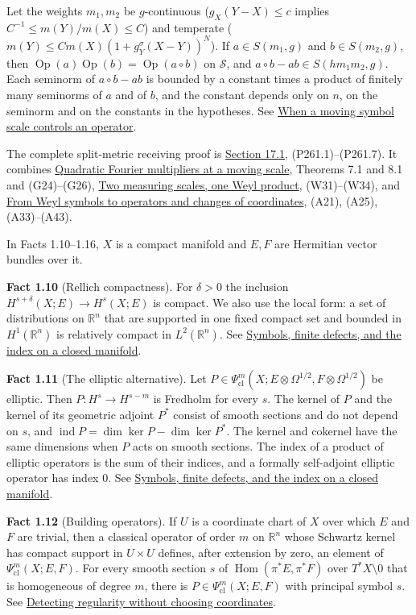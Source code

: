 \documentclass[
  11pt,
]{article}
\begin{document}
Let the weights \(m_1,m_2\) be \(g\)-continuous (\(g_X(Y-X)\le c\)
implies \(C^{-1}\le m(Y)/m(X)\le C\)) and temperate
(\(m(Y)\le Cm(X)(1+g^\sigma_Y(X-Y))^N\)). If \(a\in S(m_1,g)\) and
\(b\in S(m_2,g)\), then
\(\operatorname{Op}(a)\operatorname{Op}(b)=\operatorname{Op}(a\circ b)\)
on \(\mathcal S\), and \(a\circ b-ab\in S(hm_1m_2,g)\). Each seminorm of
\(a\circ b-ab\) is bounded by a constant times a product of finitely
many seminorms of \(a\) and of \(b\), and the constant depends only on
\(n\), on the seminorm and on the constants in the hypotheses. See
\href{metric-operator-bounds.pdf}{When a moving symbol scale controls an
operator}.

The complete split-metric receiving proof is
\hyperref[AN03-BOTT-P261-1]{Section 17.1}, (P261.1)--(P261.7). It
combines \href{gauss-transform-estimates.pdf}{Quadratic Fourier
multipliers at a moving scale}, Theorems 7.1 and 8.1 and (G24)--(G26),
\href{weyl-metric-products.pdf}{Two measuring scales, one Weyl product},
(W31)--(W34), and \href{weyl-covariance-action.pdf}{From Weyl symbols to
operators and changes of coordinates}, (A21), (A25), (A33)--(A43).

In Facts 1.10--1.16, \(X\) is a compact manifold and \(E,F\) are
Hermitian vector bundles over it.

\textbf{Fact 1.10} (Rellich compactness). For \(\delta>0\) the inclusion
\(H^{s+\delta}(X;E)\to H^s(X;E)\) is compact. We also use the local
form: a set of distributions on \(\mathbb R^n\) that are supported in
one fixed compact set and bounded in \(H^1(\mathbb R^n)\) is relatively
compact in \(L^2(\mathbb R^n)\). See
\href{global-elliptic-symbol-index.pdf}{Symbols, finite defects, and the
index on a closed manifold}.

\textbf{Fact 1.11} (The elliptic alternative). Let
\(P\in\Psi^m_{\mathrm{cl}}(X;E\otimes\Omega^{1/2},F\otimes\Omega^{1/2})\)
be elliptic. Then \(P:H^s\to H^{s-m}\) is Fredholm for every \(s\). The
kernel of \(P\) and the kernel of its geometric adjoint \(P^*\) consist
of smooth sections and do not depend on \(s\), and
\(\operatorname{ind}P=\dim\ker P-\dim\ker P^*\). The kernel and cokernel
have the same dimensions when \(P\) acts on smooth sections. The index
of a product of elliptic operators is the sum of their indices, and a
formally self-adjoint elliptic operator has index \(0\). See
\href{global-elliptic-symbol-index.pdf}{Symbols, finite defects, and the
index on a closed manifold}.

\textbf{Fact 1.12} (Building operators). If \(U\) is a coordinate chart
of \(X\) over which \(E\) and \(F\) are trivial, then a classical
operator of order \(m\) on \(\mathbb R^n\) whose Schwartz kernel has
compact support in \(U\times U\) defines, after extension by zero, an
element of \(\Psi^m_{\mathrm{cl}}(X;E,F)\). For every smooth section
\(s\) of \(\operatorname{Hom}(\pi^*E,\pi^*F)\) over \(T^*X\setminus0\)
that is homogeneous of degree \(m\), there is
\(P\in\Psi^m_{\mathrm{cl}}(X;E,F)\) with principal symbol \(s\). See
\href{geometric-microlocal-calculus.pdf}{Detecting regularity without
choosing coordinates}.
\end{document}
